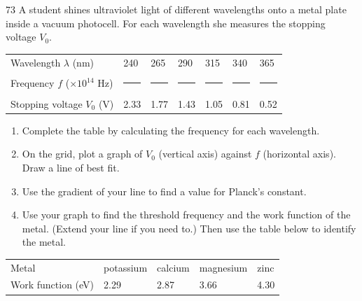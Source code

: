 \begin{practiceq}{7}{3}\label{pq:pegraph}
A student shines ultraviolet light of different wavelengths onto a metal plate inside a vacuum
photocell. For each wavelength she measures the stopping voltage $V_0$.
\begin{center}\small
  \begin{tabular}{@{}L{44mm}*{6}{C{13mm}}@{}}
    \toprule
    Wavelength $\lambda$ (\si{nm}) & 240 & 265 & 290 & 315 & 340 & 365\\
    Frequency $f$ ($\times10^{14}$ \si{Hz})\rule{0pt}{7mm} & \rule{9mm}{0.4pt} & \rule{9mm}{0.4pt} &
      \rule{9mm}{0.4pt} & \rule{9mm}{0.4pt} & \rule{9mm}{0.4pt} & \rule{9mm}{0.4pt}\\
    Stopping voltage $V_0$ (\si{V}) & 2.33 & 1.77 & 1.43 & 1.05 & 0.81 & 0.52\\
    \bottomrule
  \end{tabular}
\end{center}
\begin{enumerate}[label=(\alph*)]
  \item Complete the table by calculating the frequency for each wavelength. 
  \item On the grid, plot a graph of $V_0$ (vertical axis) against $f$ (horizontal axis).
        Draw a line of best fit. 
  \item Use the gradient of your line to find a value for Planck's constant. 
  \item Use your graph to find the threshold frequency and the work function of the metal.
        (Extend your line if you need to.) Then use the table below to identify the metal.
\end{enumerate}
\begin{center}\small
  \begin{tabular}{@{}L{36mm}C{20mm}C{20mm}C{20mm}C{20mm}@{}}
    \toprule
    Metal & potassium & calcium & magnesium & zinc\\
    Work function (\si{eV}) & 2.29 & 2.87 & 3.66 & 4.30\\
    \bottomrule
  \end{tabular}
\end{center}
\begin{center}
\end{center}
\end{practiceq}
